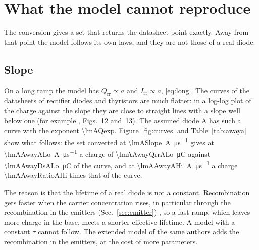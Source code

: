 \documentclass[10pt,a4paper]{scrartcl}
\newcommand{\Irr}{I_\mathrm{rr}}
\newcommand{\Qrr}{Q_\mathrm{rr}}
\begin{document}
\section{What the model cannot reproduce}
\label{sec:limits}
The conversion gives a set that returns the datasheet point exactly. Away from that point the model follows its own laws, and they are not those of a real diode.

\subsection{Slope}
\label{sec:slope}
On a long ramp the model has $\Qrr \propto a$ and $\Irr \propto a$, \eqref{eq:long}. The curves of the datasheets of rectifier diodes and thyristors are much flatter: in a log-log plot of the charge against the slope they are close to straight lines with a slope well below one (for example \cite{an5950}, Figs.~12 and~13). The assumed diode A has such a curve with the exponent \num{\lmAQexp}. Figure~\ref{fig:curves} and Table~\ref{tab:awaya} show what follows: the set converted at \SI{\lmASlope}{\ampere\per\micro\second} gives at \SI{\lmAAwayALo}{\ampere\per\micro\second} a charge of \SI{\lmAAwayQrrALo}{\micro\coulomb} against \SI{\lmAAwayDsALo}{\micro\coulomb} of the curve, and at \SI{\lmAAwayAHi}{\ampere\per\micro\second} a charge \num{\lmAAwayRatioAHi} times that of the curve.

The reason is that the lifetime of a real diode is not a constant. Recombination gets faster when the carrier concentration rises, in particular through the recombination in the emitters (Sec.~\ref{sec:emitter}) \cite{schlangenotto1969}, so a fast ramp, which leaves more charge in the base, meets a shorter effective lifetime. A model with a constant $\tau$ cannot follow. The extended model of the same authors \cite{ma1993} adds the recombination in the emitters, at the cost of more parameters.
\end{document}

